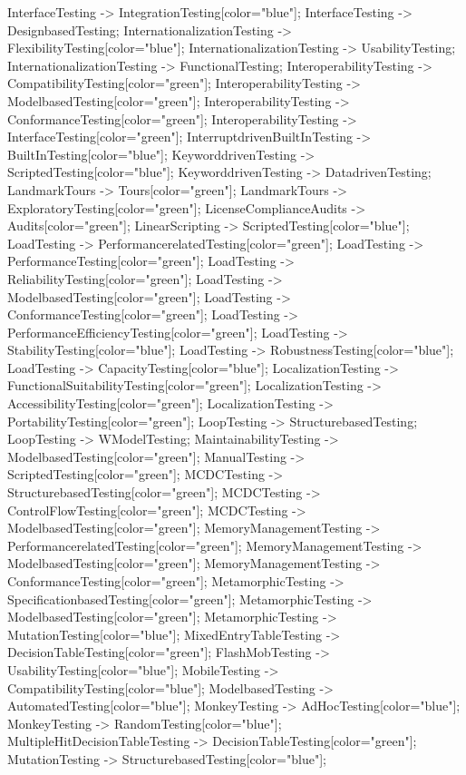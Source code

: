 \documentclass{article}
\begin{document}
{InterfaceTesting -> IntegrationTesting[color="blue"];
InterfaceTesting -> DesignbasedTesting;
InternationalizationTesting -> FlexibilityTesting[color="blue"];
InternationalizationTesting -> UsabilityTesting;
InternationalizationTesting -> FunctionalTesting;
InteroperabilityTesting -> CompatibilityTesting[color="green"];
InteroperabilityTesting -> ModelbasedTesting[color="green"];
InteroperabilityTesting -> ConformanceTesting[color="green"];
InteroperabilityTesting -> InterfaceTesting[color="green"];
InterruptdrivenBuiltInTesting -> BuiltInTesting[color="blue"];
KeyworddrivenTesting -> ScriptedTesting[color="blue"];
KeyworddrivenTesting -> DatadrivenTesting;
LandmarkTours -> Tours[color="green"];
LandmarkTours -> ExploratoryTesting[color="green"];
LicenseComplianceAudits -> Audits[color="green"];
LinearScripting -> ScriptedTesting[color="blue"];
LoadTesting -> PerformancerelatedTesting[color="green"];
LoadTesting -> PerformanceTesting[color="green"];
LoadTesting -> ReliabilityTesting[color="green"];
LoadTesting -> ModelbasedTesting[color="green"];
LoadTesting -> ConformanceTesting[color="green"];
LoadTesting -> PerformanceEfficiencyTesting[color="green"];
LoadTesting -> StabilityTesting[color="blue"];
LoadTesting -> RobustnessTesting[color="blue"];
LoadTesting -> CapacityTesting[color="blue"];
LocalizationTesting -> FunctionalSuitabilityTesting[color="green"];
LocalizationTesting -> AccessibilityTesting[color="green"];
LocalizationTesting -> PortabilityTesting[color="green"];
LoopTesting -> StructurebasedTesting;
LoopTesting -> WModelTesting;
MaintainabilityTesting -> ModelbasedTesting[color="green"];
ManualTesting -> ScriptedTesting[color="green"];
MCDCTesting -> StructurebasedTesting[color="green"];
MCDCTesting -> ControlFlowTesting[color="green"];
MCDCTesting -> ModelbasedTesting[color="green"];
MemoryManagementTesting -> PerformancerelatedTesting[color="green"];
MemoryManagementTesting -> ModelbasedTesting[color="green"];
MemoryManagementTesting -> ConformanceTesting[color="green"];
MetamorphicTesting -> SpecificationbasedTesting[color="green"];
MetamorphicTesting -> ModelbasedTesting[color="green"];
MetamorphicTesting -> MutationTesting[color="blue"];
MixedEntryTableTesting -> DecisionTableTesting[color="green"];
FlashMobTesting -> UsabilityTesting[color="blue"];
MobileTesting -> CompatibilityTesting[color="blue"];
ModelbasedTesting -> AutomatedTesting[color="blue"];
MonkeyTesting -> AdHocTesting[color="blue"];
MonkeyTesting -> RandomTesting[color="blue"];
MultipleHitDecisionTableTesting -> DecisionTableTesting[color="green"];
MutationTesting -> StructurebasedTesting[color="blue"];
}
\end{document}
